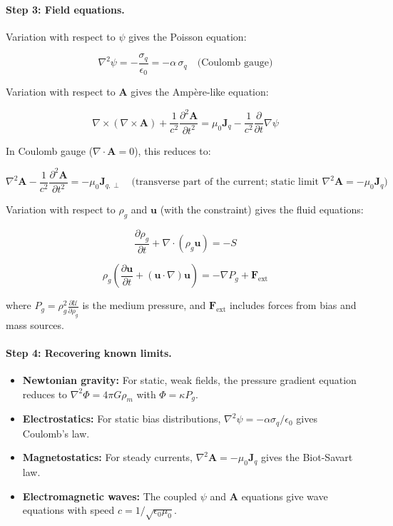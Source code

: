\documentclass[12pt, a4paper]{article}
\begin{document}
\paragraph{Step 3: Field equations.}

Variation with respect to \( \psi \) gives the Poisson equation:

\[
\nabla^2 \psi = -\frac{\sigma_q}{\epsilon_0} = -\alpha\, \sigma_q \quad \text{(Coulomb gauge)}
\]

Variation with respect to \( \mathbf{A} \) gives the Ampère-like equation:

\[
\nabla \times (\nabla \times \mathbf{A}) + \frac{1}{c^2} \frac{\partial^2 \mathbf{A}}{\partial t^2} = \mu_0 \mathbf{J}_q - \frac{1}{c^2}\frac{\partial}{\partial t}\nabla\psi
\]

In Coulomb gauge (\( \nabla \cdot \mathbf{A} = 0 \)), this reduces to:

\[
\nabla^2 \mathbf{A} - \frac{1}{c^2} \frac{\partial^2 \mathbf{A}}{\partial t^2} = -\mu_0 \mathbf{J}_{q,\perp} \quad \text{(transverse part of the current; static limit } \nabla^2 \mathbf{A} = -\mu_0 \mathbf{J}_q \text{)}
\]

Variation with respect to \( \rho_g \) and \( \mathbf{u} \) (with the constraint) gives the fluid equations:

\[
\frac{\partial \rho_g}{\partial t} + \nabla \cdot (\rho_g \mathbf{u}) = -S
\]

\[
\rho_g \left( \frac{\partial \mathbf{u}}{\partial t} + (\mathbf{u} \cdot \nabla) \mathbf{u} \right) = -\nabla P_g + \mathbf{F}_{\text{ext}}
\]

where \( P_g = \rho_g^2 \frac{\partial \mathcal{U}}{\partial \rho_g} \) is the medium pressure, and \( \mathbf{F}_{\text{ext}} \) includes forces from bias and mass sources.

\paragraph{Step 4: Recovering known limits.}

\begin{itemize}
    \item \textbf{Newtonian gravity:} For static, weak fields, the pressure gradient equation reduces to \( \nabla^2 \Phi = 4\pi G \rho_m \) with \( \Phi = \kappa P_g \).
    
    \item \textbf{Electrostatics:} For static bias distributions, \( \nabla^2 \psi = -\alpha \sigma_q / \epsilon_0 \) gives Coulomb's law.
    
    \item \textbf{Magnetostatics:} For steady currents, \( \nabla^2 \mathbf{A} = -\mu_0 \mathbf{J}_q \) gives the Biot-Savart law.
    
    \item \textbf{Electromagnetic waves:} The coupled \( \psi \) and \( \mathbf{A} \) equations give wave equations with speed \( c = 1/\sqrt{\epsilon_0 \mu_0} \).
\end{itemize}
\end{document}
